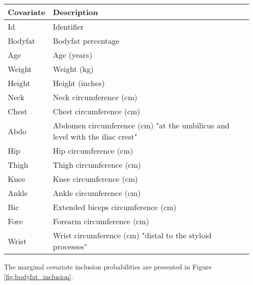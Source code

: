 \documentclass{amsart}[12pt]
\begin{document}
\begin{tabular}{|ll|}
	\hline
	Covariate & Description                                                                  \\
	\hline
	Id        & Identifier                                                                   \\
	Bodyfat   & Bodyfat percentage                                                           \\
	Age       & Age (years)                                                                  \\
	Weight    & Weight (kg)                                                                  \\
	Height    & Height (inches)                                                              \\
	Neck      & Neck circumference (cm)                                                      \\
	Chest     & Chest circumference (cm)                                                     \\
	Abdo      & Abdomen circumference (cm) "at the umbilicus and level with the iliac crest" \\
	Hip       & Hip circumference (cm)                                                       \\
	Thigh     & Thigh circumference (cm)                                                     \\
	Knee      & Knee circumference (cm)                                                      \\
	Ankle     & Ankle circumference (cm)                                                     \\
	Bic       & Extended biceps circumference (cm)                                           \\
	Fore      & Forearm circumference (cm)                                                   \\
	Wrist     & Wrist circumference (cm) "distal to the styloid processes"                   \\
	\hline
\end{tabular}

The marginal covariate inclusion probabilities are presented in Figure \ref{fig:bodyfat_inclusion}.

\end{document}
